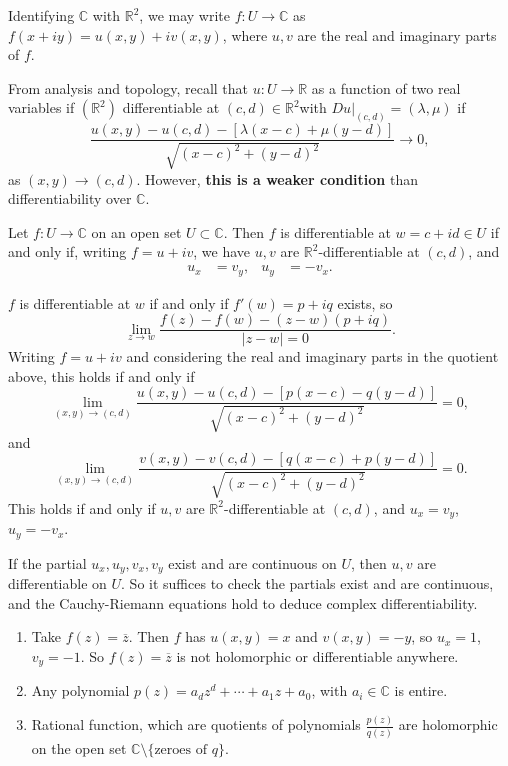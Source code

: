 \documentclass[12pt]{article}
\begin{document}
Identifying $\mathbb{C}$ with $\mathbb{R}^2$, we may write $f : U \to \mathbb{C}$ as $f(x+iy) = u(x,y) + iv(x, y)$, where $u, v$ are the real and imaginary parts of $f$.

From analysis and topology, recall that $u : U \to \mathbb{R}$ as a function of two real variables if $(\mathbb{R}^2)$ differentiable at $(c, d) \in \mathbb{R}^2$with $Du|_{(c,d)} = (\lambda, \mu)$ if
\[
	\frac{u(x,y) - u(c,d) - [\lambda(x-c) + \mu(y-d)]}{\sqrt{(x-c)^2 + (y-d)^2}} \to 0
,\]
as $(x, y) \to (c, d)$. However, \textbf{this is a weaker condition} than differentiability over $\mathbb{C}$.

\begin{proposition}
	Let $f : U \to \mathbb{C}$ on an open set $U \subset \mathbb{C}$. Then $f$ is differentiable at $w = c+id \in U$ if and only if, writing $f = u + iv$, we have $u, v$ are $\mathbb{R}^2$-differentiable at $(c, d)$, and
	\begin{align*}
		u_{x} &= v_y, & u_y &= -v_x.
\end{align*}
\end{proposition}

\begin{proofbox}
	$f$ is differentiable at $w$ if and only if $f'(w) = p + iq$ exists, so
	\[
	\lim_{z \to w}\frac{f(z) - f(w) - (z - w)(p + iq)}{|z - w| = 0}
	.\]
	Writing $f = u + iv$ and considering the real and imaginary parts in the quotient above, this holds if and only if
	\[
		\lim_{(x, y) \to (c, d)} \frac{u(x, y) - u(c, d) - [p(x-c) - q(y-d)]}{\sqrt{(x - c)^2 + (y - d)^2}} = 0
	,\]
	and
	\[
		\lim_{(x, y) \to (c, d)} \frac{v(x, y) - v(c, d) - [q(x-c) + p(y-d)]}{\sqrt{(x-c)^2+(y-d)^2}} = 0
	.\]
	This holds if and only if $u, v$ are $\mathbb{R}^2$-differentiable at $(c, d)$, and $u_x = v_y$, $u_y = -v_x$.
\end{proofbox}

\begin{remark}
	If the partial $u_x, u_y, v_x, v_y$ exist and are continuous on $U$, then $u, v$ are differentiable on $U$. So it suffices to check the partials exist and are continuous, and the Cauchy-Riemann equations hold to deduce complex differentiability.
\end{remark}

\begin{exbox}
	\begin{enumerate}
		\item Take $f(z) = \overline{z}$. Then $f$ has $u(x, y) = x$ and $v(x, y) = -y$, so $u_x = 1$, $v_y = -1$. So $f(z) = \overline{z}$ is not holomorphic or differentiable anywhere.
		\item Any polynomial $p(z) = a_d z^{d} + \cdots + a_1z + a_0$, with $a_i \in \mathbb{C}$ is entire.
		\item Rational function, which are quotients of polynomials $\frac{p(z)}{q(z)}$ are holomorphic on the open set $\mathbb{C}\setminus\{\text{zeroes of } q\}$.
	\end{enumerate}
\end{exbox}
\end{document}
